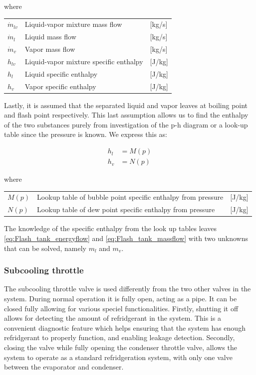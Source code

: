 where

\begin{center}
	\begin{tabular}{l p{8cm} l}
		$\dot{m}_{lv}$			&  Liquid-vapor mixture mass flow			& [\si{kg}/\si{s}]\\
		$\dot{m}_{l}$			&  Liquid mass flow 						& [\si{kg}/\si{s}] \\
		$\dot{m}_{v}$			&  Vapor mass flow							& [\si{kg}/\si{s}]\\
		$h_{lv}$				&  Liquid-vapor mixture specific enthalpy	& [\si{J}/\si{kg}]\\
		$h_{l}$					&  Liquid specific enthalpy 				& [\si{J}/\si{kg}] \\
		$h_{v}$					&  Vapor specific enthalpy					& [\si{J}/\si{kg}]\\

	\end{tabular}
\end{center}


Lastly, it is assumed that the separated liquid and vapor leaves at boiling point and flash point respectively. This last assumption allows us to find the enthalpy of the two substances purely from investigation of the p-h diagram or a look-up table since the pressure is known. We express this as:

\begin{align}
	h_{l}  & = M(p)\\
	h_{v}  & = N(p)
\end{align}

where

\begin{center}
	\begin{tabular}{l p{8cm} l}
		$M(p)$ & Lookup table of bubble point specific enthalpy from pressure & [\si{J}/\si{kg}] \\
		$N(p)$ & Lookup table of dew point specific enthalpy from pressure    & [\si{J}/\si{kg}]
	\end{tabular}
\end{center}

The knowledge of the specific enthalpy from the look up tables leaves \cref{eq:Flash_tank_energyflow} and \cref{eq:Flash_tank_massflow} with two unknowns that can be solved, namely $ m_l $ and $ m_v $.

\subsubsection{Subcooling throttle}
The subcooling throttle valve is used differently from the two other valves in the system. During normal operation it is fully open, acting as a pipe. It can be closed fully allowing for various speciel functionalities. Firstly, shutting it off allows for detecting the amount of refridgerant in the system. This is a convenient diagnostic feature which helps ensuring that the system has enough refridgerant to properly function, and enabling leakage detection. Secondly, closing the valve while fully opening the condenser throttle valve, allows the system to operate as a standard refridgeration system, with only one valve between the evaporator and condenser.


